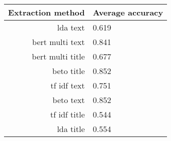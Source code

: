 \begin{tabular}{|r|l|}
  \hline
  Extraction method & Average accuracy \\ 
  \hline
  lda text & 0.619 \\ 
  \hline
  bert multi text & 0.841 \\ 
  \hline
  bert multi title & 0.677 \\ 
  \hline
  beto title & 0.852 \\ 
  \hline
  tf idf text & 0.751 \\ 
  \hline
  beto text & 0.852 \\ 
  \hline
  tf idf title & 0.544 \\ 
  \hline
  lda title & 0.554 \\ 
  \hline
\end{tabular}
